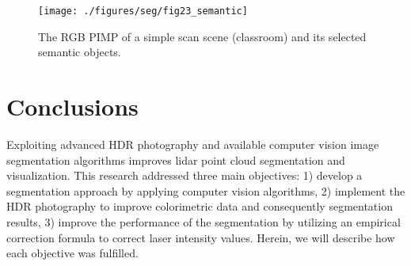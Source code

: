 \documentclass[final,3p,times,twocolumn,authoryear]{elsarticle}
\begin{document}
\begin{figure*}
	\centering
	\texttt{[image: ./figures/seg/fig23\_semantic]}
	\caption{The RGB PIMP of a simple scan scene (classroom) and its selected semantic objects.}
	\label{fig:fig23_semantic}
\end{figure*}


\section{Conclusions}
\label{seg:con}

Exploiting advanced HDR photography and available computer vision image segmentation algorithms improves lidar point cloud segmentation and visualization. 
This research addressed three main objectives: 1) develop a segmentation approach by applying computer vision algorithms, 2) implement the HDR photography to improve colorimetric data and consequently segmentation results, 3) improve the performance of the segmentation by utilizing an empirical correction formula to correct laser intensity values. Herein, we will describe how each objective was fulfilled.  
\end{document}
